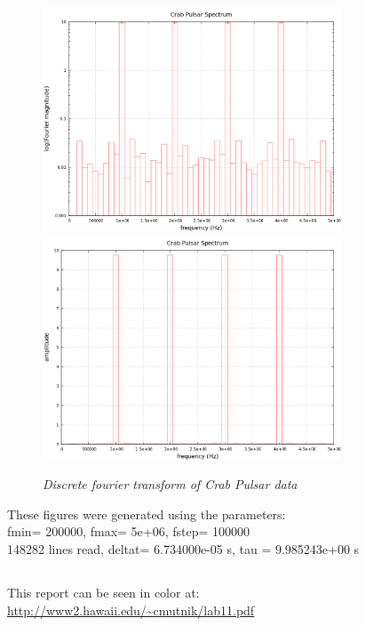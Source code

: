 \documentclass[11pt]{article}
\begin{document}
%
%
\begin{figure}[H]
 \centerline{\includegraphics[width=3.5in]{crab.png}\includegraphics[width=3.5in]{crabnolog.png}}
\caption{\it \small{Discrete fourier transform of Crab Pulsar data \label{fig5}}}
\end{figure}
These figures were generated using the parameters:\\
fmin= 200000, fmax= 5e+06, fstep= 100000\\
148282 lines read, deltat= 6.734000e-05 s, tau = 9.985243e+00 s




\subsection*{}
This report can be seen in color at:\\
\url{http://www2.hawaii.edu/~cmutnik/lab11.pdf}
\end{document}
